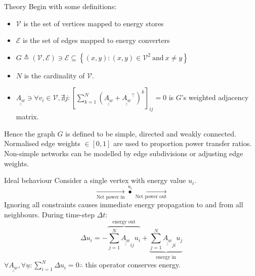 \documentclass{beamer}
\begin{document}
\begin{frame}{Theory}
    Begin with some definitions:
    \begin{itemize}
        \item $\mathcal{V}$ is the set of vertices mapped to energy stores
        \item $\mathcal{E}$ is the set of edges mapped to energy converters
        \item $G \triangleq(\mathcal{V},\mathcal{E})\ni\mathcal{E}\subseteq\left \{(x,y):(x,y)\in\mathcal{V}^2\ \text{and}\ x\neq y\right \}$
        \item $N$ is the cardinality of $\mathcal{V}$.
        \item $\underline{\underline{A_w}}\ni \forall v_i \in \mathcal{V}, \nexists j:\left [ \sum_{k = 1}^{N} \left (\underline{\underline{A_w}}+\underline{\underline{A_w}}^\top\right )^k\right ]_{ij}= 0$ is $G$'s weighted adjacency matrix.
    \end{itemize}
    \bigbreak
    Hence the graph $G$ is defined to be simple, directed and weakly connected. Normalised edge weights $\in [0, 1]$ are used to proportion power transfer ratios.
    \bigbreak
    Non-simple networks can be modelled by edge subdivisions or adjusting edge weights.
\end{frame}

\begin{frame}{Ideal behaviour}
    Consider a single vertex with energy value $u_{i}$.
    $$\xrightarrow[\text{Net power in}]{}\overset{u_i}{\bullet} \xrightarrow[\text{Net power out}]{}$$
    Ignoring all constraints causes immediate energy propagation to and from all neighbours.
    \bigbreak
    During time-step $\varDelta t$:
    $$\varDelta u_i = -\overbrace{\sum_{j=1}^{N} \underline{\underline{A_w}}_{ij} u_i}^{\text{energy out}} +\underbrace{\sum_{j=1}^{N} \underline{\underline{A_w}}_{ji} u_j}_{\text{energy in}}$$
    $\forall\underline{\underline{A_w}},\forall\underline{u}:\sum_{i=1}^{N}\varDelta u_i=0\therefore$ this operator conserves energy.
\end{frame}
\end{document}
